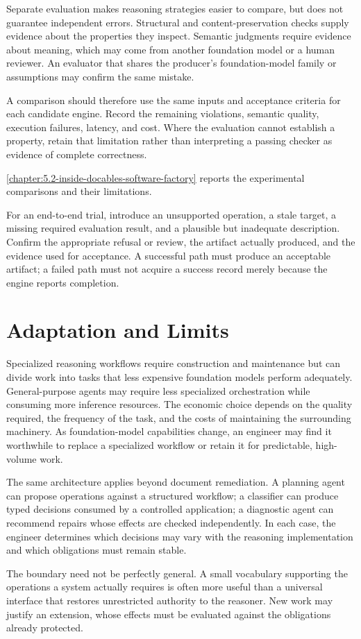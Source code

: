 Separate evaluation makes reasoning strategies easier to compare, but does not guarantee independent errors. Structural and content-preservation checks supply evidence about the properties they inspect. Semantic judgments require evidence about meaning, which may come from another foundation model or a human reviewer. An evaluator that shares the producer's foundation-model family or assumptions may confirm the same mistake.

A comparison should therefore use the same inputs and acceptance criteria for each candidate engine. Record the remaining violations, semantic quality, execution failures, latency, and cost. Where the evaluation cannot establish a property, retain that limitation rather than interpreting a passing checker as evidence of complete correctness.

\autoref{chapter:5.2-inside-docables-software-factory} reports the experimental comparisons and their limitations.

For an end-to-end trial, introduce an unsupported operation, a stale target, a missing required evaluation result, and a plausible but inadequate description. Confirm the appropriate refusal or review, the artifact actually produced, and the evidence used for acceptance. A successful path must produce an acceptable artifact; a failed path must not acquire a success record merely because the engine reports completion.

\section{Adaptation and Limits}\label{heading:adaptation-and-limits}

Specialized reasoning workflows require construction and maintenance but can divide work into tasks that less expensive foundation models perform adequately. General-purpose agents may require less specialized orchestration while consuming more inference resources. The economic choice depends on the quality required, the frequency of the task, and the costs of maintaining the surrounding machinery. As foundation-model capabilities change, an engineer may find it worthwhile to replace a specialized workflow or retain it for predictable, high-volume work.

The same architecture applies beyond document remediation. A planning agent can propose operations against a structured workflow; a classifier can produce typed decisions consumed by a controlled application; a diagnostic agent can recommend repairs whose effects are checked independently. In each case, the engineer determines which decisions may vary with the reasoning implementation and which obligations must remain stable.

The boundary need not be perfectly general. A small vocabulary supporting the operations a system actually requires is often more useful than a universal interface that restores unrestricted authority to the reasoner. New work may justify an extension, whose effects must be evaluated against the obligations already protected.
